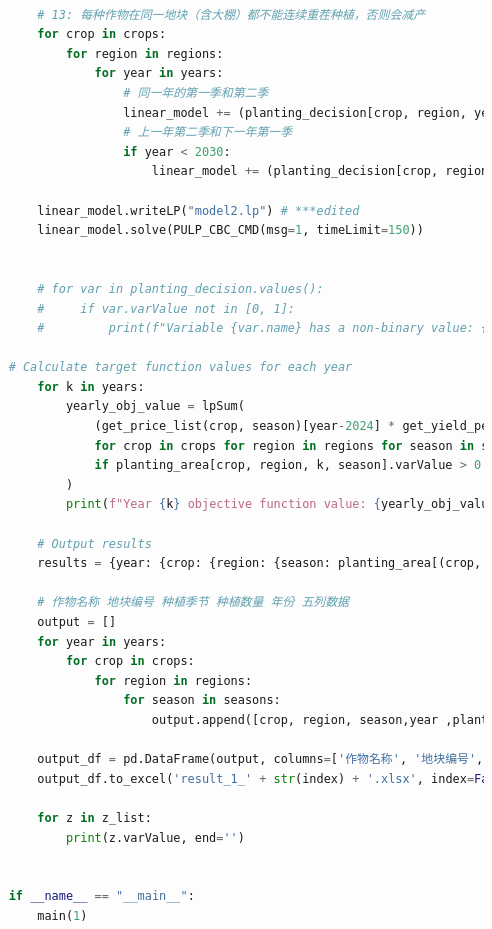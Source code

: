 \documentclass{cumcmthesis}
\begin{document}
\begin{appendices}
\begin{lstlisting}[language=python]
        
        # 13: 每种作物在同一地块（含大棚）都不能连续重茬种植，否则会减产
        for crop in crops:
            for region in regions:
                for year in years:
                    # 同一年的第一季和第二季
                    linear_model += (planting_decision[crop, region, year, '第一季'] + planting_decision[crop, region, year, '第二季'] <= 1)
                    # 上一年第二季和下一年第一季
                    if year < 2030:
                        linear_model += (planting_decision[crop, region, year, '第二季'] + planting_decision[crop, region, year+1, '第一季'] <= 1)
    
        linear_model.writeLP("model2.lp") # ***edited
        linear_model.solve(PULP_CBC_CMD(msg=1, timeLimit=150))
    
    
        # for var in planting_decision.values():
        #     if var.varValue not in [0, 1]:
        #         print(f"Variable {var.name} has a non-binary value: {var.varValue}")
    
    # Calculate target function values for each year
        for k in years:
            yearly_obj_value = lpSum(
                (get_price_list(crop, season)[year-2024] * get_yield_per_acre_list(crop, region)[year-2024] - get_cost_list(crop, region)[year-2024]) * planting_area[crop, region, k, season].varValue
                for crop in crops for region in regions for season in seasons
                if planting_area[crop, region, k, season].varValue > 0  # Only consider variables with planting area greater than 0
            )
            print(f"Year {k} objective function value: {yearly_obj_value}")
    
        # Output results
        results = {year: {crop: {region: {season: planting_area[(crop, region, year, season)].varValue for season in seasons} for region in regions} for crop in crops} for year in years}
    
        # 作物名称 地块编号 种植季节 种植数量 年份 五列数据
        output = []
        for year in years:
            for crop in crops:
                for region in regions:
                    for season in seasons:
                        output.append([crop, region, season,year ,planting_area[(crop, region, year, season)].varValue])
    
        output_df = pd.DataFrame(output, columns=['作物名称', '地块编号', '种植季节','年份', '种植数量'])
        output_df.to_excel('result_1_' + str(index) + '.xlsx', index=False)
    
        for z in z_list:
            print(z.varValue, end='')
    
    
    if __name__ == "__main__":
        main(1)
    
\end{lstlisting}
\end{appendices}
\end{document}
